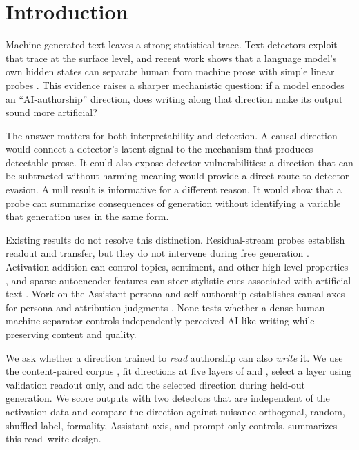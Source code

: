 \section{Introduction}
\label{sec:introduction}

Machine-generated text leaves a strong statistical trace. Text detectors exploit that trace at the surface level, and recent work shows that a language model's own hidden states can separate human from machine prose with simple linear probes \cite{quaremba2026linear,vishnyakov2026svdetect}. This evidence raises a sharper mechanistic question: if a model encodes an ``AI-authorship'' direction, does writing along that direction make its output sound more artificial?

The answer matters for both interpretability and detection. A causal direction would connect a detector's latent signal to the mechanism that produces detectable prose. It could also expose detector vulnerabilities: a direction that can be subtracted without harming meaning would provide a direct route to detector evasion. A null result is informative for a different reason. It would show that a probe can summarize consequences of generation without identifying a variable that generation uses in the same form.

Existing results do not resolve this distinction. Residual-stream probes establish readout and transfer, but they do not intervene during free generation \cite{quaremba2026linear,vishnyakov2026svdetect}. Activation addition can control topics, sentiment, and other high-level properties \cite{turner2023steering,zou2023representation}, and sparse-autoencoder features can steer stylistic cues associated with artificial text \cite{kuznetsov2025feature}. Work on the Assistant persona and self-authorship establishes causal axes for persona and attribution judgments \cite{lu2026assistant,ackerman2025inspection}. None tests whether a dense human--machine separator controls independently perceived AI-like writing while preserving content and quality.

 We ask whether a direction trained to \emph{read} authorship can also \emph{write} it. We use the content-paired \hape corpus \cite{reinhart2025llms}, fit directions at five layers of \qweninst and \qwenbase \cite{qwen2024qwen25}, select a layer using validation readout only, and add the selected direction during held-out generation. We score outputs with two detectors that are independent of the activation data and compare the direction against nuisance-orthogonal, random, shuffled-label, formality, Assistant-axis, and prompt-only controls.  summarizes this read--write design.

